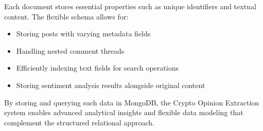 Each document stores essential properties such as unique identifiers and textual content. The flexible schema allows for:

\begin{itemize}
    \item Storing posts with varying metadata fields
    \item Handling nested comment threads
    \item Efficiently indexing text fields for search operations
    \item Storing sentiment analysis results alongside original content
\end{itemize}

By storing and querying such data in MongoDB, the Crypto Opinion Extraction system enables advanced analytical insights and flexible data modeling that complement the structured relational approach.
